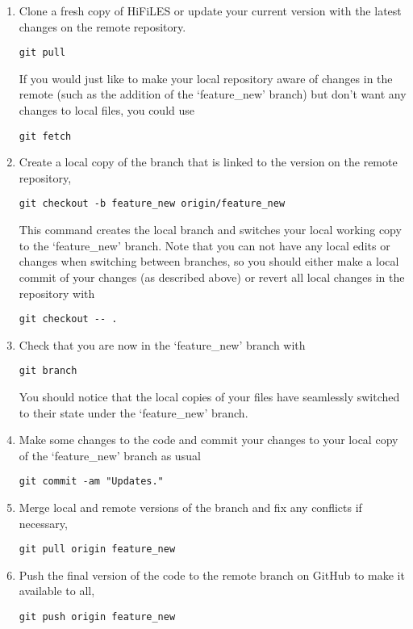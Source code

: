\documentclass[letter,10pt]{article}
\begin{document}
\begin{enumerate}

\item Clone a fresh copy of HiFiLES or update your current version with the latest changes on the remote repository.
\begin{verbatim}
git pull
\end{verbatim}
If you would just like to make your local repository aware of changes in the remote (such as the addition of the `feature\_new' branch) but don't want any changes to local files, you could use
\begin{verbatim}
git fetch
\end{verbatim}

\item Create a local copy of the branch that is linked to the version on the remote repository,
\begin{verbatim}
git checkout -b feature_new origin/feature_new
\end{verbatim}
This command creates the local branch and switches your local working copy to the `feature\_new' branch. Note that you can not have any local edits or changes when switching between branches, so you should either make a local commit of your changes (as described above) or revert all local changes in the repository with
\begin{verbatim}
git checkout -- .
\end{verbatim}

\item Check that you are now in the `feature\_new' branch with
\begin{verbatim}
git branch
\end{verbatim}
You should notice that the local copies of your files have seamlessly switched to their state under the `feature\_new' branch.

\item Make some changes to the code and commit your changes to your local copy of the `feature\_new' branch as usual
\begin{verbatim}
git commit -am "Updates."
\end{verbatim}

\item Merge local and remote versions of the branch and fix any conflicts if necessary,
\begin{verbatim}
git pull origin feature_new
\end{verbatim}

\item Push the final version of the code to the remote branch on GitHub to make it available to all,
\begin{verbatim}
git push origin feature_new 
\end{verbatim}

\end{enumerate}
\end{document}
